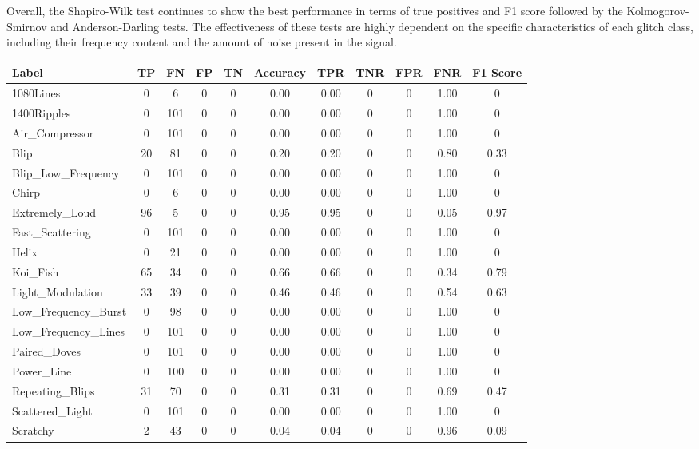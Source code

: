\documentclass[12pt]{article}
\begin{document}
\noindent Overall, the Shapiro-Wilk test continues to show the best performance in terms of true positives and F1 score followed by the Kolmogorov-Smirnov and Anderson-Darling tests. The effectiveness of these tests are highly dependent on the specific characteristics of each glitch class, including their frequency content and the amount of noise present in the signal.

\begin{table}[H]
  \begin{tabular}{lcccccccccc}
  \toprule
  Label & TP & FN & FP & TN & Accuracy & TPR & TNR & FPR & FNR & F1 Score \\
  \midrule
  1080Lines & 0 & 6 & 0 & 0 & 0.00 & 0.00 & 0 & 0 & 1.00 & 0 \\
  1400Ripples & 0 & 101 & 0 & 0 & 0.00 & 0.00 & 0 & 0 & 1.00 & 0 \\
  Air\_Compressor & 0 & 101 & 0 & 0 & 0.00 & 0.00 & 0 & 0 & 1.00 & 0 \\
  Blip & 20 & 81 & 0 & 0 & 0.20 & 0.20 & 0 & 0 & 0.80 & 0.33 \\
  Blip\_Low\_Frequency & 0 & 101 & 0 & 0 & 0.00 & 0.00 & 0 & 0 & 1.00 & 0 \\
  Chirp & 0 & 6 & 0 & 0 & 0.00 & 0.00 & 0 & 0 & 1.00 & 0 \\
  Extremely\_Loud & 96 & 5 & 0 & 0 & 0.95 & 0.95 & 0 & 0 & 0.05 & 0.97 \\
  Fast\_Scattering & 0 & 101 & 0 & 0 & 0.00 & 0.00 & 0 & 0 & 1.00 & 0 \\
  Helix & 0 & 21 & 0 & 0 & 0.00 & 0.00 & 0 & 0 & 1.00 & 0 \\
  Koi\_Fish & 65 & 34 & 0 & 0 & 0.66 & 0.66 & 0 & 0 & 0.34 & 0.79 \\
  Light\_Modulation & 33 & 39 & 0 & 0 & 0.46 & 0.46 & 0 & 0 & 0.54 & 0.63 \\
  Low\_Frequency\_Burst & 0 & 98 & 0 & 0 & 0.00 & 0.00 & 0 & 0 & 1.00 & 0 \\
  Low\_Frequency\_Lines & 0 & 101 & 0 & 0 & 0.00 & 0.00 & 0 & 0 & 1.00 & 0 \\
  Paired\_Doves & 0 & 101 & 0 & 0 & 0.00 & 0.00 & 0 & 0 & 1.00 & 0 \\
  Power\_Line & 0 & 100 & 0 & 0 & 0.00 & 0.00 & 0 & 0 & 1.00 & 0 \\
  Repeating\_Blips & 31 & 70 & 0 & 0 & 0.31 & 0.31 & 0 & 0 & 0.69 & 0.47 \\
  Scattered\_Light & 0 & 101 & 0 & 0 & 0.00 & 0.00 & 0 & 0 & 1.00 & 0 \\
  Scratchy & 2 & 43 & 0 & 0 & 0.04 & 0.04 & 0 & 0 & 0.96 & 0.09 \\

\end{tabular}
\end{table}
\end{document}
